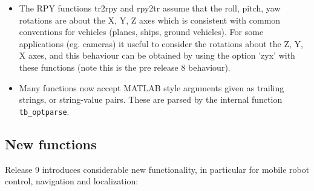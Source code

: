 \documentclass[a4paper]{report}
\begin{document}
\begin{itemize}
\item The RPY functions tr2rpy and rpy2tr assume that the roll, pitch, yaw rotations are about the X, Y, Z axes which is consistent with common conventions for vehicles (planes, ships, ground vehicles). For some applications (eg. cameras) it useful to consider the rotations about the Z, Y, X axes, and this behaviour can be obtained by using the option 'zyx' with these functions (note this is the pre release 8 behaviour).
\item Many functions now accept MATLAB style arguments given as trailing strings, or string-value pairs.  These are parsed by the internal
function \texttt{tb\_optparse}.
\end{itemize}


\subsection{New functions}
Release 9 introduces considerable new functionality, in particular for mobile robot control, navigation and localization:
\end{document}
